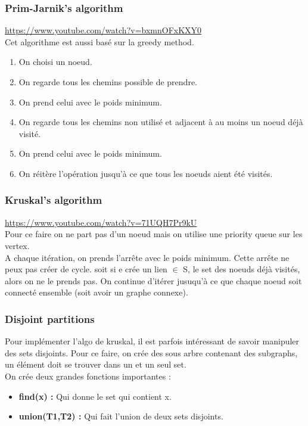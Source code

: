 \documentclass[a4paper]{article}
\begin{document}
\subsubsection{Prim-Jarnik's algorithm}
\url{https://www.youtube.com/watch?v=bxmnOFxKXY0}\\
Cet algorithme est aussi basé sur la greedy method.
\begin{enumerate}
\item On choisi un noeud.
\item On regarde tous les chemins possible de prendre.
\item On prend celui avec le poids minimum.
\item On regarde tous les chemins non utilisé et adjacent à au moins un noeud déjà visité.
\item On prend celui avec le poids minimum.
\item On réitère l'opération jusqu'à ce que tous les noeuds aient été visités.
\end{enumerate}

\subsubsection{Kruskal's algorithm}
\url{https://www.youtube.com/watch?v=71UQH7Pr9kU}\\
Pour ce faire on ne part pas d'un noeud mais on utilise une priority queue sur les vertex.\\
A chaque itération, on prends l'arrête avec le poids minimum. Cette arrête ne peux pas créer de cycle. soit si e crée un lien $\in$ S, le set des noeuds déjà visités, alors on ne le prends pas. On continue d'itérer jusuqu'à ce que chaque noeud soit connecté ensemble (soit avoir un graphe connexe).
\subsubsection*{Disjoint partitions}
Pour implémenter l'algo de kruskal, il est parfois intéressant de savoir manipuler des sets disjoints. Pour ce faire, on crée des sous arbre contenant des subgraphs, un élément doit se trouver dans un et un seul set.\\
On crée deux grandes fonctions importantes :
\begin{itemize}
\item \textbf{find(x) :} Qui donne le set qui contient x.
\item \textbf{union(T1,T2) :} Qui fait l'union de deux sets disjoints.
\end{itemize}
\end{document}
